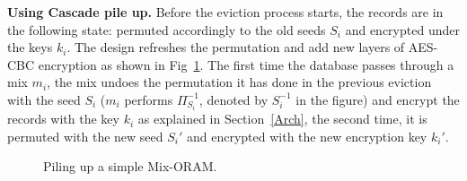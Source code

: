 \documentclass[USenglish,oneside,twocolumn]{article}
\begin{document}
\noindent\textbf{Using Cascade pile up.} Before the eviction process starts, the records are in the following state: permuted accordingly to the old seeds $S_i$ and encrypted under the keys $k_i$. The design refreshes the permutation and add new layers of AES-CBC encryption as shown in Fig~\ref{fig:ASMO_CBC}. The first time the database passes through a mix $m_i$, the mix undoes the permutation it has done in the previous eviction with the seed $S_i$ ($m_i$ performs $\Pi_{S_i}^{-1}$, denoted by $S_i^{-1}$ in the figure) and encrypt the records with the key $k_i$ as explained in Section~\ref{Arch}, the second time, it is permuted with the new seed $S_i'$ and encrypted with the new encryption key $k_{i}'$.\\
%
\begin{figure}[H]
\begin{minipage}{0.475\textwidth}
\begin{adjustbox}{width=\textwidth}
\end{adjustbox}
\centering
\caption{Piling up a simple Mix-ORAM.} \label{fig:ASMO_CBC}
\end{minipage}
\end{figure} 
\end{document}
